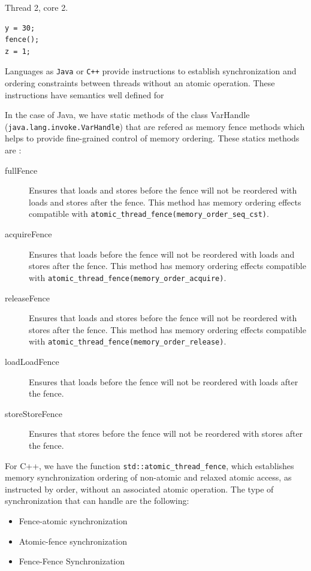 \documentclass{latex/classes/thesis}
\begin{document}
Thread 2, core 2.
\lstset{language=c++,label= ,caption= ,captionpos=b,numbers=none}
\begin{lstlisting}
y = 30;
fence();
z = 1;
\end{lstlisting}


Languages as \texttt{Java} or \texttt{C++} provide instructions to establish synchronization
and ordering constraints between threads without an atomic operation. These
instructions have semantics well defined for

In the case of Java, we have static methods of the class VarHandle
(\texttt{java.lang.invoke.VarHandle}) that are refered as memory fence methods which
helps to provide fine-grained control of memory ordering. These statics
methods are \cite{varHandleJdk92017}:

\begin{description}
\item[{fullFence}] Ensures that loads and stores before the fence will not be
reordered with loads and stores after the fence. This method has memory
ordering effects compatible with
\texttt{atomic\_thread\_fence(memory\_order\_seq\_cst)}.
\item[{acquireFence}] Ensures that loads before the fence will not be reordered
with loads and stores after the fence. This method has memory ordering
effects compatible with \texttt{atomic\_thread\_fence(memory\_order\_acquire)}.
\item[{releaseFence}] Ensures that loads and stores before the fence will not
be reordered with stores after the fence. This method has memory ordering
effects compatible with \texttt{atomic\_thread\_fence(memory\_order\_release)}.
\item[{loadLoadFence}] Ensures that loads before the fence will not be
reordered with loads after the fence.
\item[{storeStoreFence}] Ensures that stores before the fence will not be
reordered with stores after the fence.
\end{description}

For C++, we have the function
\texttt{std::atomic\_thread\_fence}\cite{threadFenceCpp2020}, which establishes
memory synchronization ordering of non-atomic and relaxed atomic access, as
instructed by order, without an associated atomic operation. The type of
synchronization that can handle are the following:

\begin{itemize}
\item Fence-atomic synchronization
\item Atomic-fence synchronization
\item Fence-Fence Synchronization
\end{itemize}
\end{document}
